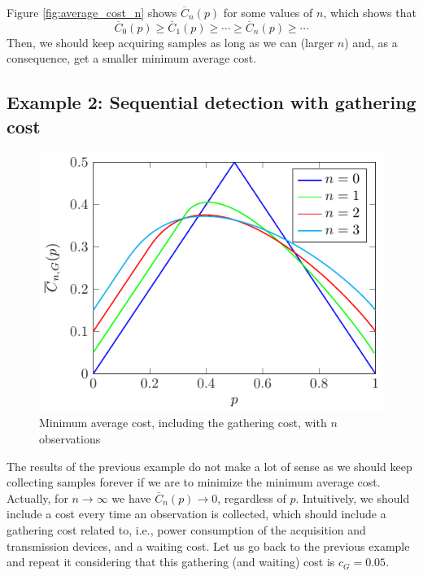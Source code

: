 Figure \ref{fig:average_cost_n} shows $\overline{C}_n(p)$ for some values of $n$, which shows that
\begin{equation*}
	\overline{C}_0(p)  \geq \overline{C}_1(p) \geq \cdots \geq \overline{C}_n(p) \geq \cdots
\end{equation*}
Then, we should keep acquiring samples as long as we can (larger $n$) and, as a consequence, get a smaller minimum average cost.

\subsection{Example 2: Sequential detection with gathering cost}

\begin{figure}[t]
	\begin{center}
		\includegraphics{Figures/Expected_Cost2}
	\end{center}
	\caption{Minimum average cost, including the gathering cost, with $n$ observations}
	\label{fig:average_cost2_n}
\end{figure}

The results of the previous example do not make a lot of sense as we should keep collecting samples forever if we are to minimize the minimum average cost. Actually, for $n \rightarrow \infty$ we have $\overline{C}_n(p) \rightarrow 0$, regardless of $p$. Intuitively, we should include a cost every time an observation is collected, which should include a gathering cost related to, i.e., power consumption of the acquisition and transmission devices, and a waiting cost. Let us go back to the previous example and repeat it considering that this gathering (and waiting) cost is $c_{G} = 0.05$.

